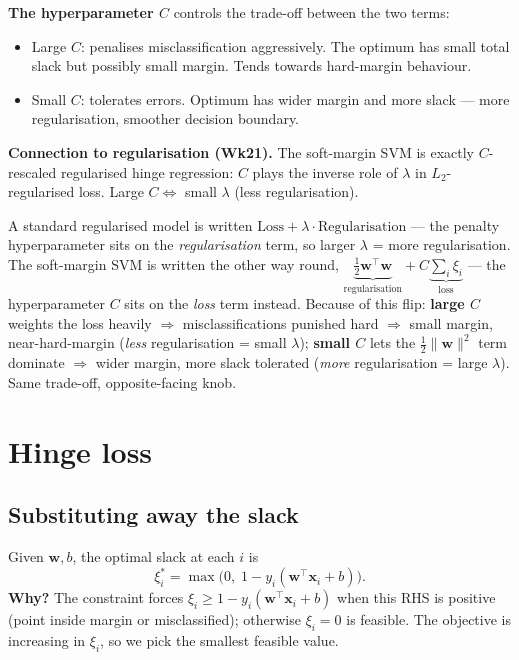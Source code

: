 \documentclass[11pt, a4paper]{article}
\begin{document}
\textbf{The hyperparameter $C$} controls the trade-off between the two terms:
\begin{itemize}
  \item Large $C$: penalises misclassification aggressively. The optimum has small total slack but possibly small margin. Tends towards hard-margin behaviour.
  \item Small $C$: tolerates errors. Optimum has wider margin and more slack — more regularisation, smoother decision boundary.
\end{itemize}

\textbf{Connection to regularisation (Wk21).} The soft-margin SVM is exactly $C$-rescaled regularised hinge regression: $C$ plays the inverse role of $\lambda$ in $L_2$-regularised loss. Large $C \Leftrightarrow$ small $\lambda$ (less regularisation).

\begin{notebox}
A standard regularised model is written $\text{Loss} + \lambda\cdot\text{Regularisation}$ — the
penalty hyperparameter sits on the \emph{regularisation} term, so larger $\lambda$ = more
regularisation. The soft-margin SVM is written the other way round,
$\underbrace{\tfrac12\mathbf{w}^\top\mathbf{w}}_{\text{regularisation}} + C\underbrace{\sum_i\xi_i}_{\text{loss}}$
— the hyperparameter $C$ sits on the \emph{loss} term instead. Because of this flip:
\textbf{large $C$} weights the loss heavily $\Rightarrow$ misclassifications punished hard
$\Rightarrow$ small margin, near-hard-margin (\emph{less} regularisation = small $\lambda$);
\textbf{small $C$} lets the $\tfrac12\|\mathbf{w}\|^2$ term dominate $\Rightarrow$ wider margin, more
slack tolerated (\emph{more} regularisation = large $\lambda$). Same trade-off, opposite-facing knob.
\end{notebox}

\section{Hinge loss}

\subsection{Substituting away the slack}

Given $\mathbf{w}, b$, the optimal slack at each $i$ is
\[
\xi_i^* = \max\big(0,\;1 - y_i(\mathbf{w}^\top\mathbf{x}_i + b)\big).
\]
\textbf{Why?} The constraint forces $\xi_i \ge 1 - y_i(\mathbf{w}^\top\mathbf{x}_i + b)$ when this RHS is positive (point inside margin or misclassified); otherwise $\xi_i = 0$ is feasible. The objective is increasing in $\xi_i$, so we pick the smallest feasible value.
\end{document}
